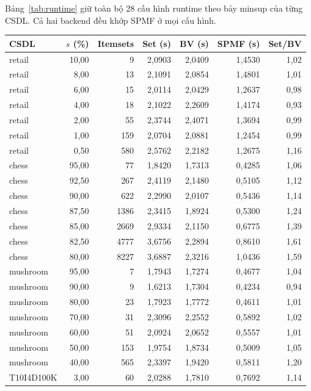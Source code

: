 {Bảng~\ref{tab:runtime} giữ toàn bộ 28 cấu hình runtime theo bảy minsup của
từng CSDL. Cả hai backend đều khớp SPMF ở mọi cấu hình.
\begin{reporttable}
\caption{Toàn bộ cấu hình runtime. Thời gian là median năm lần, đơn vị giây; BV là BitVector. Tất cả cấu hình khớp SPMF.}\label{tab:runtime}
\centering\footnotesize
\begin{tabular}{lrrrrrr}\toprule
CSDL & $s$ (\%) & Itemsets & Set (s) & BV (s) & SPMF (s) & Set/BV \\\midrule
retail & 10,00 & 9 & 2,0903 & 2,0409 & 1,4530 & 1,02 \\
retail & 8,00 & 13 & 2,1091 & 2,0854 & 1,4801 & 1,01 \\
retail & 6,00 & 15 & 2,0114 & 2,0429 & 1,2637 & 0,98 \\
retail & 4,00 & 18 & 2,1022 & 2,2609 & 1,4174 & 0,93 \\
retail & 2,00 & 55 & 2,3744 & 2,4071 & 1,3694 & 0,99 \\
retail & 1,00 & 159 & 2,0704 & 2,0881 & 1,2454 & 0,99 \\
retail & 0,50 & 580 & 2,5762 & 2,2182 & 1,2675 & 1,16 \\
chess & 95,00 & 77 & 1,8420 & 1,7313 & 0,4285 & 1,06 \\
chess & 92,50 & 267 & 2,4119 & 2,1480 & 0,5105 & 1,12 \\
chess & 90,00 & 622 & 2,2990 & 2,0107 & 0,5436 & 1,14 \\
chess & 87,50 & 1386 & 2,3415 & 1,8924 & 0,5300 & 1,24 \\
chess & 85,00 & 2669 & 2,9334 & 2,1150 & 0,6775 & 1,39 \\
chess & 82,50 & 4777 & 3,6756 & 2,2894 & 0,8610 & 1,61 \\
chess & 80,00 & 8227 & 3,6887 & 2,3216 & 1,0436 & 1,59 \\
mushroom & 95,00 & 7 & 1,7943 & 1,7274 & 0,4677 & 1,04 \\
mushroom & 90,00 & 9 & 1,6213 & 1,7304 & 0,4234 & 0,94 \\
mushroom & 80,00 & 23 & 1,7923 & 1,7772 & 0,4611 & 1,01 \\
mushroom & 70,00 & 31 & 2,3096 & 2,2552 & 0,5892 & 1,02 \\
mushroom & 60,00 & 51 & 2,0924 & 2,0652 & 0,5557 & 1,01 \\
mushroom & 50,00 & 153 & 1,9754 & 1,8734 & 0,5009 & 1,05 \\
mushroom & 40,00 & 565 & 2,3397 & 1,9420 & 0,5811 & 1,20 \\
T10I4D100K & 3,00 & 60 & 2,0288 & 1,7810 & 0,7692 & 1,14 \\

\end{tabular}
\end{reporttable}}
